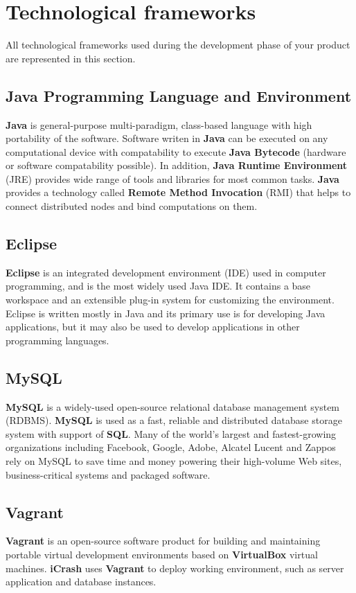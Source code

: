 \chapter{Technological frameworks}
\label{chap:techFrm}


All technological frameworks used during the development phase of your product
are represented in this section.

\section{Java Programming Language and Environment}
\label{sec:Java}
\textbf{Java} is general-purpose multi-paradigm, class-based language with high
portability of the software. Software writen in \textbf{Java} can be executed on
any computational device with compatability to execute \textbf{Java Bytecode}
(hardware or software compatability possible). In addition, \textbf{Java Runtime
Environment} (JRE) provides wide range of tools and libraries for most common
tasks. \textbf{Java} provides a technology called \textbf{Remote Method
Invocation} (RMI) that helps to connect distributed nodes and bind computations
on them.

\section{Eclipse}
\label{sec:eclipse}
\textbf{Eclipse} is an integrated development environment (IDE) used in computer
programming, and is the most widely used Java IDE. It contains a base workspace
and an extensible plug-in system for customizing the environment. Eclipse is
written mostly in Java and its primary use is for developing Java applications,
but it may also be used to develop applications in other programming languages.

\section{MySQL}
\label{sec:MySQL}
\textbf{MySQL} is a widely-used open-source relational database
management system (RDBMS). \textbf{MySQL} is used as a fast, reliable and
distributed database storage system with support of \textbf{SQL}. Many of the
world's largest and fastest-growing organizations including Facebook, Google,
Adobe, Alcatel Lucent and Zappos rely on MySQL to save time and money powering 
their high-volume Web sites, business-critical systems and packaged software.

\section{Vagrant}
\label{sec:vagrant}
\textbf{Vagrant} is an open-source software product for building and maintaining
portable virtual development environments based on \textbf{VirtualBox}
virtual machines. \textbf{iCrash} uses \textbf{Vagrant} to deploy working
environment, such as server application and database instances.

